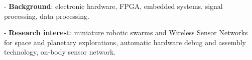 - \textbf{Background}: electronic hardware, FPGA, embedded systems, signal processing, data processing.

- \textbf{Research interest}: miniature robotic swarms and Wireless Sensor Networks for space and planetary
explorations, automatic hardware debug  and assembly technology, on-body sensor network.
